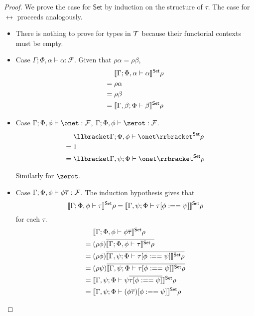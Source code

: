 \documentclass[acmsmall,review,anonymous]{acmart}
\theoremstyle{definition}
\newcommand{\F}{\mathcal{F}}
\newcommand{\set}{\mathsf{Set}}
\begin{document}
\begin{proof}
We prove the case for $\set$ by induction on the structure of $\tau$.
The case for $\rel$ proceeds analogously.
\begin{itemize}
  \item There is nothing to prove for types in $\mathcal{T}$ because their functorial contexts
        must be empty.
  \item Case $\Gamma; \Phi, \alpha \vdash \alpha : \F$. Given that $\rho \alpha = \rho \beta$, 
    \begin{align*}
         & \setsem{\Gamma; \Phi, \alpha \vdash \alpha } \rho \\
    = \; & \rho \alpha \\
    = \; & \rho \beta \\
    = \; & \setsem{\Gamma, \beta; \Phi \vdash \beta } \rho
    \end{align*}

  \item Case $\Gamma; \Phi, \phi \vdash \onet :\F$,  $\Gamma; \Phi, \phi \vdash \zerot :\F$.
    \begin{align*}
         & \setsem{\Gamma; \Phi, \phi \vdash \onet } \rho \\
    = \; & 1 \\
    = \; & \setsem{\Gamma, \psi; \Phi \vdash \onet } \rho
    \end{align*}

    Similarly for $\zerot$.

  \item Case $\Gamma; \Phi, \phi \vdash \phi \ol\tau : \F$. The induction hypothesis gives that 
    $$\setsem{\Gamma; \Phi, \phi \vdash \tau } \rho
      = \setsem{\Gamma, \psi; \Phi \vdash \tau[\phi :== \psi] } \rho$$ 
    for each $\tau$.
    \begin{align*}
         & \setsem{\Gamma; \Phi, \phi \vdash \phi \ol\tau } \rho \\
      = \; & (\rho \phi) \ol{\setsem{\Gamma; \Phi, \phi \vdash \tau } \rho} \\
      = \; & (\rho \phi) \ol{\setsem{\Gamma, \psi; \Phi \vdash \tau[\phi :== \psi] } \rho} \\
      = \; & (\rho \psi) \ol{\setsem{\Gamma, \psi; \Phi \vdash \tau[\phi :== \psi] } \rho} \\
      = \; & \setsem{\Gamma, \psi; \Phi \vdash \psi \ol{\tau[\phi :== \psi]} } \rho \\
      = \; & \setsem{\Gamma, \psi; \Phi \vdash (\phi \ol\tau)[\phi :== \psi] } \rho
    \end{align*}
  

\end{itemize}
\end{proof}
\end{document}
